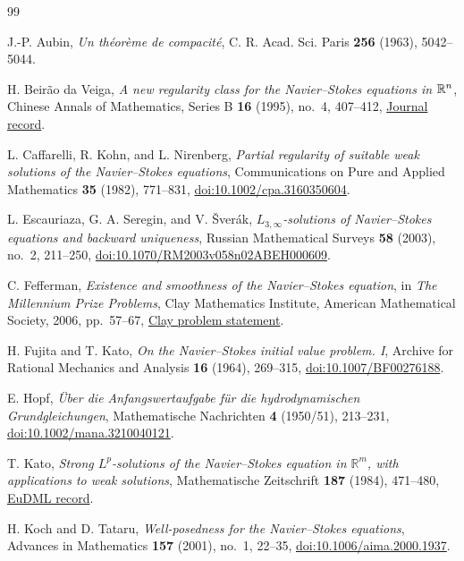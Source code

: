 \begin{thebibliography}{99}
\small
\raggedright

J.-P. Aubin,
\emph{Un th\'eor\`eme de compacit\'e},
C. R. Acad. Sci. Paris \textbf{256} (1963), 5042--5044.

H. Beir\~ao da Veiga,
\emph{A new regularity class for the Navier--Stokes equations in \(\mathbb R^n\)},
Chinese Annals of Mathematics, Series B \textbf{16} (1995), no.~4, 407--412,
\href{https://camath.fudan.edu.cn/cambcn/ch/reader/view_abstract.aspx?file_no=16B401&flag=1}{Journal record}.

L. Caffarelli, R. Kohn, and L. Nirenberg,
\emph{Partial regularity of suitable weak solutions of the
Navier--Stokes equations},
Communications on Pure and Applied Mathematics \textbf{35} (1982), 771--831,
\href{https://doi.org/10.1002/cpa.3160350604}{doi:10.1002/cpa.3160350604}.

L. Escauriaza, G. A. Seregin, and V. \v{S}ver\'ak,
\emph{$L_{3,\infty}$-solutions of Navier--Stokes equations and backward
uniqueness},
Russian Mathematical Surveys \textbf{58} (2003), no.~2, 211--250,
\href{https://doi.org/10.1070/RM2003v058n02ABEH000609}{doi:10.1070/RM2003v058n02ABEH000609}.

C. Fefferman,
\emph{Existence and smoothness of the Navier--Stokes equation},
in \emph{The Millennium Prize Problems}, Clay Mathematics Institute,
American Mathematical Society, 2006, pp.~57--67,
\href{https://www.claymath.org/wp-content/uploads/2022/06/navierstokes.pdf}{Clay problem statement}.

H. Fujita and T. Kato,
\emph{On the Navier--Stokes initial value problem. I},
Archive for Rational Mechanics and Analysis \textbf{16} (1964), 269--315,
\href{https://doi.org/10.1007/BF00276188}{doi:10.1007/BF00276188}.

E. Hopf,
\emph{\"Uber die Anfangswertaufgabe f\"ur die hydrodynamischen
Grundgleichungen},
Mathematische Nachrichten \textbf{4} (1950/51), 213--231,
\href{https://doi.org/10.1002/mana.3210040121}{doi:10.1002/mana.3210040121}.

T. Kato,
\emph{Strong \(L^p\)-solutions of the Navier--Stokes equation in
\(\mathbb R^m\), with applications to weak solutions},
Mathematische Zeitschrift \textbf{187} (1984), 471--480,
\href{https://eudml.org/doc/173504}{EuDML record}.

H. Koch and D. Tataru,
\emph{Well-posedness for the Navier--Stokes equations},
Advances in Mathematics \textbf{157} (2001), no.~1, 22--35,
\href{https://doi.org/10.1006/aima.2000.1937}{doi:10.1006/aima.2000.1937}.


\end{thebibliography}
